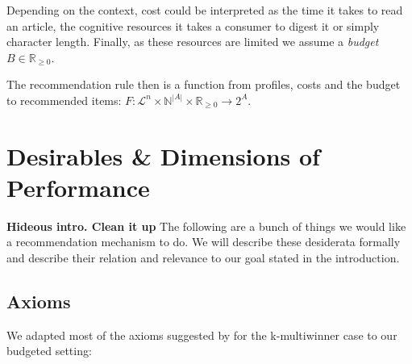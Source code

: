 \documentclass{article}
\begin{document}
Depending on the context, cost could be interpreted as the time it takes to read an article,
the cognitive resources it takes a consumer to digest it or simply character length.
 Finally, as these resources are limited we assume a \emph {budget} $B\in \mathbb{R}_{\geq 0}$.

The recommendation rule then is a function from profiles, costs and the budget to recommended items: $F:\mathcal{L}^n\times \mathbb{N}^{|A|}\times \mathbb{R}_{\geq 0} \rightarrow 2^A$.

\section{Desirables \& Dimensions of Performance}%

{\bf Hideous intro. Clean it up} The following are a bunch of things we would like a recommendation mechanism to do.
We will describe these desiderata formally and describe their relation and relevance to our goal stated in the introduction.

\subsection{Axioms}

We adapted most of the axioms suggested by  for the k-multiwinner case to our budgeted setting:
\end{document}
